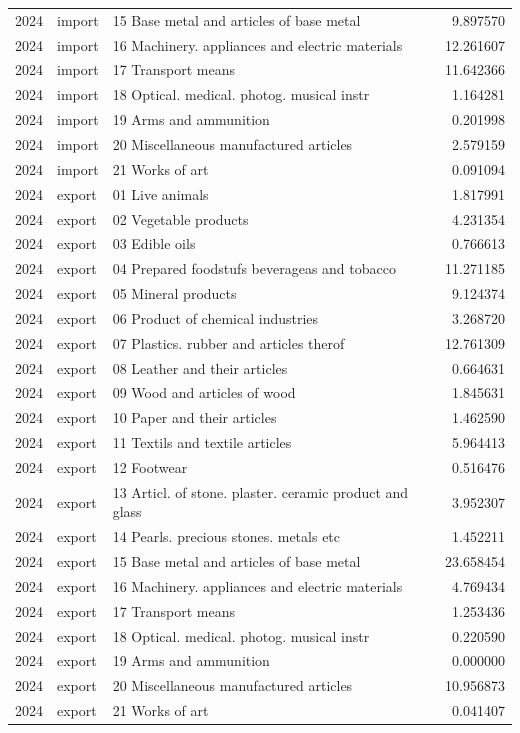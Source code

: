 \begin{tabular}{rllr}
2024 & import & 15 Base metal and articles of base metal & 9.897570 \\
2024 & import & 16 Machinery. appliances and electric materials & 12.261607 \\
2024 & import & 17 Transport means & 11.642366 \\
2024 & import & 18 Optical. medical. photog. musical instr & 1.164281 \\
2024 & import & 19 Arms and ammunition & 0.201998 \\
2024 & import & 20 Miscellaneous manufactured articles & 2.579159 \\
2024 & import & 21 Works of art & 0.091094 \\
2024 & export & 01 Live animals & 1.817991 \\
2024 & export & 02 Vegetable products & 4.231354 \\
2024 & export & 03 Edible oils & 0.766613 \\
2024 & export & 04 Prepared foodstufs beverageas and tobacco & 11.271185 \\
2024 & export & 05 Mineral products & 9.124374 \\
2024 & export & 06 Product of chemical industries & 3.268720 \\
2024 & export & 07 Plastics. rubber and articles therof & 12.761309 \\
2024 & export & 08 Leather and their articles & 0.664631 \\
2024 & export & 09 Wood and articles of wood & 1.845631 \\
2024 & export & 10 Paper and their articles & 1.462590 \\
2024 & export & 11 Textils and textile articles & 5.964413 \\
2024 & export & 12 Footwear & 0.516476 \\
2024 & export & 13 Articl. of stone. plaster. ceramic product and glass & 3.952307 \\
2024 & export & 14 Pearls. precious stones. metals etc & 1.452211 \\
2024 & export & 15 Base metal and articles of base metal & 23.658454 \\
2024 & export & 16 Machinery. appliances and electric materials & 4.769434 \\
2024 & export & 17 Transport means & 1.253436 \\
2024 & export & 18 Optical. medical. photog. musical instr & 0.220590 \\
2024 & export & 19 Arms and ammunition & 0.000000 \\
2024 & export & 20 Miscellaneous manufactured articles & 10.956873 \\
2024 & export & 21 Works of art & 0.041407 \\
\bottomrule
\end{tabular}
